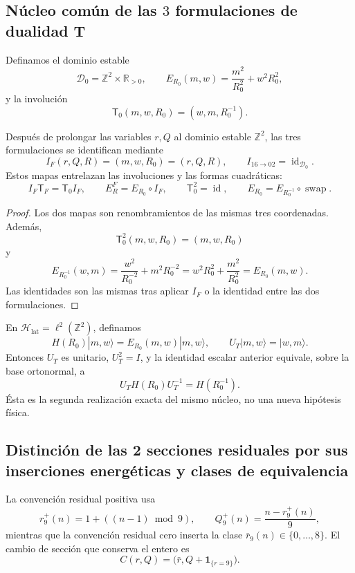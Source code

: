 \subsection{Núcleo común de las \(3\) formulaciones de dualidad T}

Definamos el dominio estable
\[
 \mathscr D_0=\mathbb Z^2\times\mathbb R_{>0},
 \qquad
 E_{R_0}(m,w)=\frac{m^2}{R_0^2}+w^2R_0^2,
\]
y la involución
\[
 \mathsf T_0(m,w,R_0)=(w,m,R_0^{-1}).
\]

\begin{theorem}
\label{thm:cierre-vtm-tres-formulaciones-t}
Después de prolongar las variables \(r,Q\) al dominio estable
\(\mathbb Z^2\), las tres formulaciones se identifican mediante
\[
 I_F(r,Q,R)=(m,w,R_0)=(r,Q,R),
 \qquad I_{16\to02}=\operatorname{id}_{\mathscr D_0}.
\]
Estos mapas entrelazan las involuciones y las formas cuadráticas:
\[
 I_F\mathsf T_F=\mathsf T_0I_F,
 \qquad
 E_R^F=E_{R_0}\circ I_F,
 \qquad
 \mathsf T_0^2=\operatorname{id},
 \qquad
 E_{R_0}=E_{R_0^{-1}}\circ\operatorname{swap}.
\]
\end{theorem}

\begin{proof}
Los dos mapas son renombramientos de las mismas tres coordenadas. Además,
\[
 \mathsf T_0^2(m,w,R_0)=(m,w,R_0)
\]
y
\[
 E_{R_0^{-1}}(w,m)
 =\frac{w^2}{R_0^{-2}}+m^2R_0^{-2}
 =w^2R_0^2+\frac{m^2}{R_0^2}
 =E_{R_0}(m,w).
\]
Las identidades son las mismas tras aplicar \(I_F\) o la identidad entre las
dos formulaciones.
\end{proof}

En \(\mathcal H_{\mathrm{lat}}=\ell^2(\mathbb Z^2)\), definamos
\[
 H(R_0)|m,w\rangle=E_{R_0}(m,w)|m,w\rangle,
 \qquad U_T|m,w\rangle=|w,m\rangle.
\]
Entonces \(U_T\) es unitario, \(U_T^2=I\), y la identidad escalar anterior
equivale, sobre la base ortonormal, a
\[
 \boxed{U_TH(R_0)U_T^{-1}=H(R_0^{-1}).}
\]
Ésta es la segunda realización exacta del mismo núcleo, no una nueva
hipótesis física.

\subsection{Distinción de las 2 secciones residuales por sus inserciones energéticas y clases de equivalencia}

La convención residual positiva usa
\[
 r_9^+(n)=1+((n-1)\bmod9),
 \qquad Q_9^+(n)=\frac{n-r_9^+(n)}9,
\]
mientras que la convención residual cero inserta la clase
\(\bar r_9(n)\in\{0,\ldots,8\}\). El cambio de sección que conserva el
entero es
\[
 C(r,Q)=\bigl(\bar r,Q+\mathbf1_{\{r=9\}}\bigr).
\]

